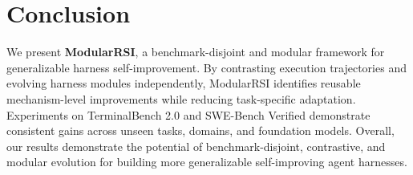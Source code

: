 \documentclass{article} %
\begin{document}
\section{Conclusion}

We present \textbf{ModularRSI}, a benchmark-disjoint and modular framework for generalizable harness self-improvement. By contrasting execution trajectories and evolving harness modules independently, ModularRSI identifies reusable mechanism-level improvements while reducing task-specific adaptation. Experiments on TerminalBench 2.0 and SWE-Bench Verified demonstrate consistent gains across unseen tasks, domains, and foundation models.
Overall, our results demonstrate the potential of benchmark-disjoint, contrastive, and modular evolution for building more generalizable self-improving agent harnesses.








\end{document}
